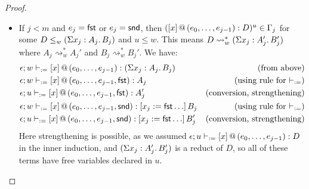 \documentclass[twoside]{report}
\begin{document}
\begin{proof}
\begin{itemize}
\begin{itemize}
        \item If $j < m$ and $e_j = \operatorname{\mathsf{fst}}$ or $e_j = \operatorname{\mathsf{snd}}$, then $({[x]}\,@\,({e_0, \ldots, e_{j-1}}) : D)^u \in \Gamma_j$ for some $D \leq_w (\Sigma{x_j} : {A_j}.\,{B_j})$ and $u \leq w$. This means $D \rightsquigarrow^\ast_w (\Sigma{x_j} : {A_j'}.\,{B_j'})$ where $A_j \rightsquigarrow^\ast_w A_j'$ and $B_j \rightsquigarrow^\ast_w B_j'$. We have:
        $$
        \begin{aligned}
        & \epsilon; w \vdash_{:=} {[x]}\,@\,({e_0, \ldots, e_{j-1}}) : (\Sigma{x_j} : {A_j}.\,{B_j}) & \text{(from above)} \\
        & \epsilon; w \vdash_{:=} {[x]}\,@\,({e_0, \ldots, e_{j-1}, \operatorname{\mathsf{fst}}}) : A_j & \text{(using rule for $\vdash_{:=}$)} \\
        & \epsilon; u \vdash_{:=} {[x]}\,@\,({e_0, \ldots, e_{j-1}, \operatorname{\mathsf{fst}}}) : A_j' & \text{(conversion, strengthening)} \\
        & \epsilon; w \vdash_{:=} {[x]}\,@\,({e_0, \ldots, e_{j-1}, \operatorname{\mathsf{snd}}}) : [{x_j}:={\operatorname{\mathsf{fst}} \ldots}]\,{B_j} & \text{(using rule for $\vdash_{:=}$)} \\
        & \epsilon; u \vdash_{:=} {[x]}\,@\,({e_0, \ldots, e_{j-1}, \operatorname{\mathsf{snd}}}) : [{x_j}:={\operatorname{\mathsf{fst}} \ldots}]\,{B_j'} & \text{(conversion, strengthening)} \\
        \end{aligned}
        $$
        Here strengthening is possible, as we assumed $\epsilon; u \vdash_{:=} {[x]}\,@\,({e_0, \ldots, e_{j-1}}) : D$ in the inner induction, and $(\Sigma{x_j} : {A_j'}.\,{B_j'})$ is a reduct of $D$, so all of these terms have free variables declared in $u$.


\end{itemize}
\end{itemize}
\end{proof}
\end{document}

